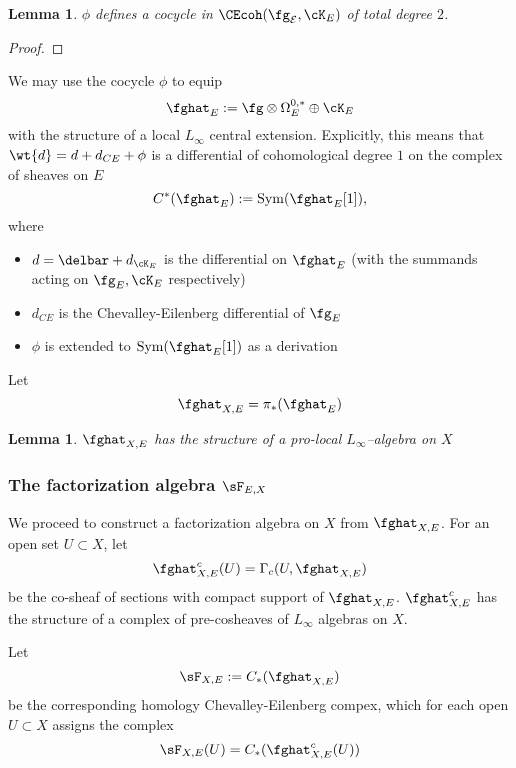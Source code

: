 \documentclass[12pt]{amsart}
\newtheorem{lemma}[theorem]{Lemma}
\theoremstyle{definition}
\theoremstyle{remark}
\newcommand{\on}{\operatorname}
\newcommand{\E}{{\mathcal E}}
\begin{document}
\begin{lemma}
$\phi$ defines a cocycle in $\CEcoh(\fg_{\E}, \cK_{E}) $ of total degree $2$.
\end{lemma}
\begin{proof}

\end{proof}

We may use the cocycle $\phi$ to equip 
\begin{equation}
\fghat_{E} := \fg \otimes \Omega^{0,*}_E \oplus \cK_{E}
\end{equation}
with the structure of a local $L_{\infty}$ central extension. Explicitly, this means that $\wt{d} = d + d_{CE} + \phi$ is a differential of cohomological degree $1$ on the complex of sheaves on $E$
\[
C^{*}(\fghat_E) := \on{Sym}(\fghat_E[1]),
\]
where 
\begin{itemize}
\item $d = \delbar + d_{\cK_E}$ is the differential on $\fghat_E$ (with the summands acting on $\fg_E, \cK_E$ respectively)
\item $d_{CE}$ is the Chevalley-Eilenberg differential of $\fg_E$
\item $\phi$ is extended to $\on{Sym}(\fghat_E[1])$ as a derivation
\end{itemize}

Let 
\begin{equation}
\fghat_{X,E} = \pi_*(\fghat_E)
\end{equation}


\begin{lemma}
$\fghat_{X,E}$ has the structure of a pro-local $L_{\infty}$--algebra on $X$
\end{lemma}

\subsubsection{The factorization algebra $\sF_{E,X}$}

We proceed to construct a factorization algebra on $X$ from $\fghat_{X,E}$. For an open set $U \subset X$, let
\begin{equation}
\fghat^c_{X,E}(U) = \Gamma_c (U, \fghat_{X,E})
\end{equation}
be the co-sheaf of sections with compact support of $\fghat_{X,E}$. $\fghat^c_{X,E}$ has the structure of a complex of pre-cosheaves of $L_{\infty}$ algebras on $X$. 

Let
\begin{equation}
\sF_{X,E} := C_{*} ( \fghat_{X,E} )
\end{equation}
be the corresponding homology Chevalley-Eilenberg compex, which for each open $U \subset X$ assigns the complex
\[
\sF_{X,E}(U) = C_{*} (\fghat^c_{X,E}(U))
\]
\end{document}
